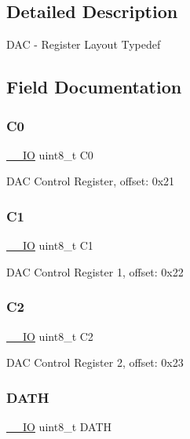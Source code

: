 \subsection{Detailed Description}
D\+AC -\/ Register Layout Typedef 

\subsection{Field Documentation}
\mbox{\label{struct_d_a_c___type_a0efd9120430014bffb829dea9ae59849}} 
\subsubsection{\texorpdfstring{C0}{C0}}
{\footnotesize\ttfamily \mbox{\hyperlink{core__cm0plus_8h_aec43007d9998a0a0e01faede4133d6be}{\+\_\+\+\_\+\+IO}} uint8\+\_\+t C0}

D\+AC Control Register, offset\+: 0x21 \mbox{\label{struct_d_a_c___type_ad54aa92be9fc988e74d55d2d3daae8ad}} 
\subsubsection{\texorpdfstring{C1}{C1}}
{\footnotesize\ttfamily \mbox{\hyperlink{core__cm0plus_8h_aec43007d9998a0a0e01faede4133d6be}{\+\_\+\+\_\+\+IO}} uint8\+\_\+t C1}

D\+AC Control Register 1, offset\+: 0x22 \mbox{\label{struct_d_a_c___type_a4f920936a8fc32483b3ebd9b0674b450}} 
\subsubsection{\texorpdfstring{C2}{C2}}
{\footnotesize\ttfamily \mbox{\hyperlink{core__cm0plus_8h_aec43007d9998a0a0e01faede4133d6be}{\+\_\+\+\_\+\+IO}} uint8\+\_\+t C2}

D\+AC Control Register 2, offset\+: 0x23 \mbox{\label{struct_d_a_c___type_ab715ae4b8d7a52b050b97bb1048fc2a2}} 
\subsubsection{\texorpdfstring{DATH}{DATH}}
{\footnotesize\ttfamily \mbox{\hyperlink{core__cm0plus_8h_aec43007d9998a0a0e01faede4133d6be}{\+\_\+\+\_\+\+IO}} uint8\+\_\+t D\+A\+TH}


